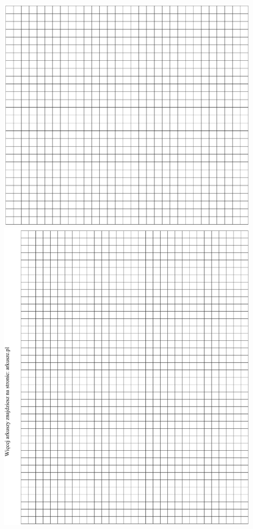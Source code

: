 \documentclass[10pt]{article}
\begin{document}
\includegraphics[max width=\textwidth, center]{2024_11_21_f29375993e8c629c464fg-20(1)}\\
\includegraphics[max width=\textwidth, center]{2024_11_21_f29375993e8c629c464fg-21}
\end{document}
